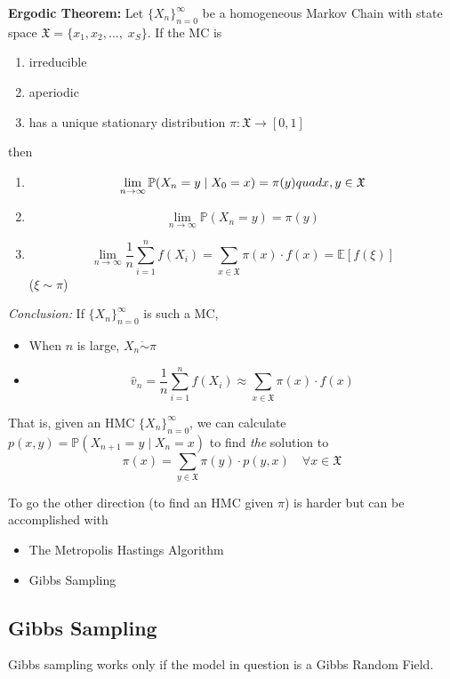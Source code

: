 \documentclass[12pt]{article}
\renewcommand{\hat}[1]{\widehat{#1}}
\renewcommand{\P}{\mathbb{P}}
\newcommand{\E}{\mathbb{E}}
\newcommand{\mfX}{\mathfrak{X}}
\begin{document}
        \textbf{Ergodic Theorem:} Let $\{X_n\}_{n=0}^\infty$ be a homogeneous Markov Chain with state space $\mfX = \{x_1, x_2, \dots,\; x_S\}$. If the MC is
        \begin{enumerate}
            \item irreducible
            \item aperiodic
            \item has a unique stationary distribution $\pi:\mfX \to [0, 1]$
        \end{enumerate}
        then
        \begin{enumerate}
            \item \[\lim_{n\to \infty} \P(X_n = y \; | \; X_0 = x) = \pi(y) \\quad x, y \in \mfX\] 
            \item \[\lim_{n\to\infty} \P(X_n = y) = \pi(y)\]
            \item \[\lim_{n\to \infty} \frac{1}{n} \sum_{i=1}^n f(X_i) = \sum_{x \in \mfX} \pi(x) \cdot f(x) = \E[f(\xi)]\]
            ($\xi \sim \pi$)
        \end{enumerate}

        \emph{Conclusion:} If $\{X_n\}_{n=0}^\infty$ is such a MC, 
        \begin{itemize}
            \item When $n$ is large, $X_n \dot \sim \pi$ 
            \item \[\hat v_n = \frac{1}{n} \sum_{i=1}^n f(X_i) \approx \sum_{x \in \mfX} \pi(x)\cdot f(x)\]
        \end{itemize}

        
        That is, given an HMC $\{X_n\}_{n=0}^\infty$, we can calculate $p(x, y) = \P(X_{n+1} = y \; | \; X_n = x)$ to find \emph{the} solution to 
        \[\pi(x) = \sum_{y\in \mfX} \pi(y) \cdot p(y, x) \quad \forall x\in \mfX\]

        To go the other direction (to find an HMC given $\pi$) is harder but can be accomplished with 
        \begin{itemize}
            \item The Metropolis Hastings Algorithm
            \item Gibbs Sampling
        \end{itemize}

    \subsection{Gibbs Sampling}
        Gibbs sampling works only if the model in question is a Gibbs Random Field. 
\end{document}
